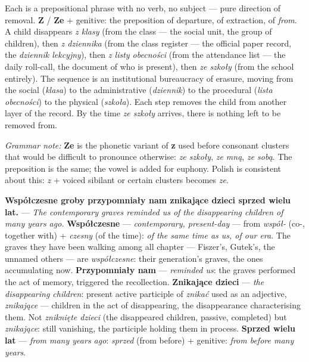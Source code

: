 Each is a prepositional phrase with no verb, no
subject --- pure direction of removal. \textbf{Z} /
\textbf{Ze} + genitive: the preposition of departure,
of extraction, of \textit{from}. A child disappears
\textit{z klasy} (from the class --- the social unit,
the group of children), then \textit{z dziennika}
(from the class register --- the official paper
record, the \textit{dziennik lekcyjny}), then
\textit{z listy obecności} (from the attendance
list --- the daily roll-call, the document of who
is present), then \textit{ze szkoły} (from the school
entirely). The sequence is an institutional
bureaucracy of erasure, moving from the social
(\textit{klasa}) to the administrative (\textit{dziennik})
to the procedural (\textit{lista obecności}) to the
physical (\textit{szkoła}). Each step removes the child
from another layer of the record. By the time
\textit{ze szkoły} arrives, there is nothing left
to be removed from.

\medskip
\noindent\textit{Grammar note:} \textbf{Ze} is the
phonetic variant of \textbf{z} used before consonant
clusters that would be difficult to pronounce
otherwise: \textit{ze szkoły}, \textit{ze mną},
\textit{ze sobą}. The preposition is the same;
the vowel is added for euphony. Polish is consistent
about this: \textit{z} + voiced sibilant or certain
clusters becomes \textit{ze}.

\medskip

\textbf{Współczesne groby przypomniały nam znikające
dzieci sprzed wielu lat.} --- \textit{The contemporary
graves reminded us of the disappearing children of
many years ago.} \textbf{Współczesne} ---
\textit{contemporary, present-day} --- from
\textit{współ-} (co-, together with) + \textit{czesny}
(of the time): \textit{of the same time as us, of
our era}. The graves they have been walking among
all chapter --- Fiszer's, Gutek's, the unnamed
others --- are \textit{współczesne}: their generation's
graves, the ones accumulating now. \textbf{Przypomniały
nam} --- \textit{reminded us}: the graves performed
the act of memory, triggered the recollection.
\textbf{Znikające dzieci} --- \textit{the disappearing
children}: present active participle of \textit{znikać}
used as an adjective, \textit{znikające} --- children
in the act of disappearing, the disappearance
characterising them. Not \textit{zniknięte dzieci}
(the disappeared children, passive, completed) but
\textit{znikające}: still vanishing, the participle
holding them in process. \textbf{Sprzed wielu lat}
--- \textit{from many years ago}: \textit{sprzed}
(from before) + genitive: \textit{from before
many years}.

